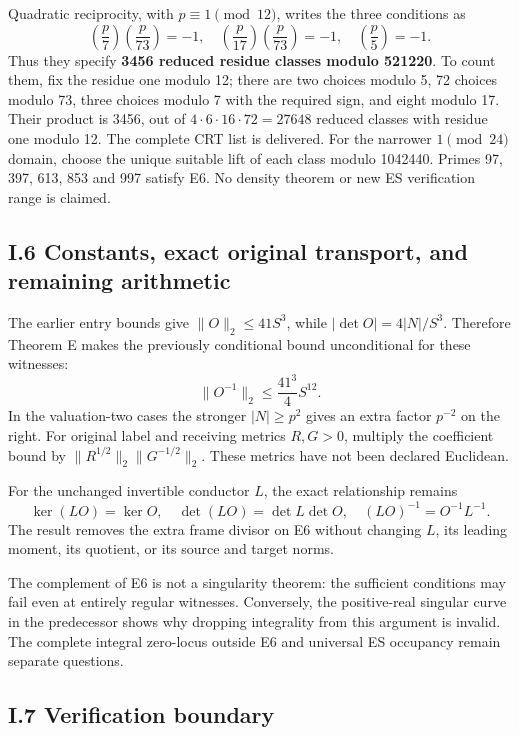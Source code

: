 Quadratic reciprocity, with \(p\equiv1\pmod{12}\), writes the three
conditions as \[
\left(\frac p7\right)\left(\frac p{73}\right)=-1,
\quad
\left(\frac p{17}\right)\left(\frac p{73}\right)=-1,
\quad
\left(\frac p5\right)=-1.
\tag{E7}
\] Thus they specify \textbf{3456 reduced residue classes modulo
521220}. To count them, fix the residue one modulo 12; there are two
choices modulo 5, 72 choices modulo 73, three choices modulo 7 with the
required sign, and eight modulo 17. Their product is 3456, out of
\(4\cdot6\cdot16\cdot72=27648\) reduced classes with residue one modulo
12. The complete CRT list is delivered. For the narrower \(1\pmod{24}\)
domain, choose the unique suitable lift of each class modulo 1042440.
Primes 97, 397, 613, 853 and 997 satisfy E6. No density theorem or new
ES verification range is claimed.

\subsection{I.6 Constants, exact original transport, and remaining
arithmetic}\label{i.6-constants-exact-original-transport-and-remaining-arithmetic}

The earlier entry bounds give \(\|O\|_2\le41S^3\), while
\(|\det O|=4|N|/S^3\). Therefore Theorem E makes the previously
conditional bound unconditional for these witnesses: \[
\boxed{\|O^{-1}\|_2\le\frac{41^3}{4}S^{12}.}
\tag{E8}
\] In the valuation-two cases the stronger \(|N|\ge p^2\) gives an extra
factor \(p^{-2}\) on the right. For original label and receiving metrics
\(R,G>0\), multiply the coefficient bound by
\(\|R^{1/2}\|_2\|G^{-1/2}\|_2\). These metrics have not been declared
Euclidean.

For the unchanged invertible conductor \(L\), the exact relationship
remains \[
\ker(LO)=\ker O,\quad \det(LO)=\det L\det O,
\quad (LO)^{-1}=O^{-1}L^{-1}.
\] The result removes the extra frame divisor on E6 without changing
\(L\), its leading moment, its quotient, or its source and target norms.

The complement of E6 is not a singularity theorem: the sufficient
conditions may fail even at entirely regular witnesses. Conversely, the
positive-real singular curve in the predecessor shows why dropping
integrality from this argument is invalid. The complete integral
zero-locus outside E6 and universal ES occupancy remain separate
questions.

\subsection{I.7 Verification boundary}\label{i.7-verification-boundary}

